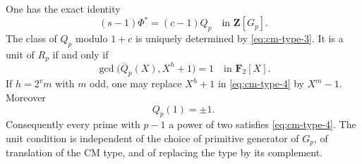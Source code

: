 \begin{proposition}\label{prop:explicit-cm-type-factor}
One has the exact identity
\begin{equation}
                 (s-1)\Phi^*=(c-1)Q_p
                  \quad\text{in }\mathbf Z[G_p].        \label{eq:cm-type-3}
\end{equation}
The class of \(Q_p\) modulo \(1+c\) is uniquely determined by \eqref{eq:cm-type-3}.
It is a unit of \(R_p\) if and only if
\begin{equation}
        \gcd\bigl(\overline Q_p(X),X^h+1\bigr)=1
                          \quad\text{in }\mathbf F_2[X].\label{eq:cm-type-4}
\end{equation}
If \(h=2^v m\) with \(m\) odd, one may replace \(X^h+1\)
in \eqref{eq:cm-type-4} by \(X^m-1\). Moreover
\begin{equation}
                         Q_p(1)=\pm1.                  \label{eq:cm-type-5}
\end{equation}
Consequently every prime with \(p-1\) a power of two satisfies
\eqref{eq:cm-type-4}. The unit condition is independent of the choice of primitive
generator of \(G_p\), of translation of the CM type, and of replacing
the type by its complement.
\end{proposition}

